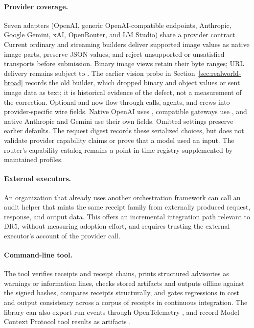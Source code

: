 \paragraph{Provider coverage.} Seven adapters (OpenAI, generic OpenAI-compatible endpoints, Anthropic, Google Gemini, xAI, OpenRouter, and LM Studio) share a provider contract. Current ordinary and streaming builders deliver supported image values as native image parts, preserve JSON values, and reject unsupported or unsatisfied transports before submission. Binary image views retain their byte ranges; URL delivery remains subject to . The earlier vision probe in Section~\ref{sec:realworld-broad} records the old builder, which dropped binary and object values or sent image data as text; it is historical evidence of the defect, not a measurement of the correction. Optional  and  now flow through calls, agents, and crews into provider-specific wire fields. Native OpenAI uses , compatible gateways use , and native Anthropic and Gemini use their own fields. Omitted settings preserve earlier defaults. The request digest records these serialized choices, but does not validate provider capability claims or prove that a model used an input. The router's capability catalog remains a point-in-time registry supplemented by maintained profiles.

\paragraph{External executors.} An organization that already uses another orchestration framework can call an audit helper that mints the same receipt family from externally produced request, response, and output data. This offers an incremental integration path relevant to DR5, without measuring adoption effort, and requires trusting the external executor's account of the provider call.

\paragraph{Command-line tool.} The tool verifies receipts and receipt chains, prints structured advisories as warnings or information lines, checks stored artifacts and outputs offline against the signed hashes, compares receipts structurally, and gates regressions in cost and output consistency across a corpus of receipts in continuous integration. The library can also export run events through OpenTelemetry \citep{otel}, and record Model Context Protocol tool results as artifacts \citep{mcp}.

